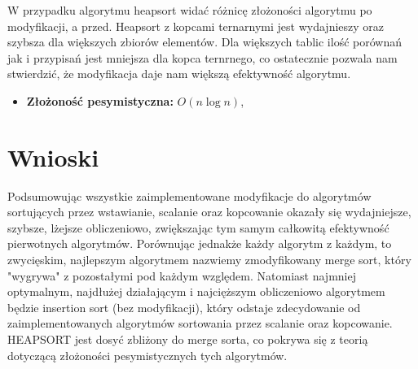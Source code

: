 \documentclass{article}
\begin{document}
\newpage

	
\large{W przypadku algorytmu heapsort widać różnicę złożoności algorytmu po modyfikacji, a przed. Heapsort z kopcami ternarnymi jest wydajnieszy oraz szybsza dla większych zbiorów elementów. Dla większych tablic ilość porównań jak i przypisań jest mniejsza dla kopca ternrnego, co ostatecznie pozwala nam stwierdzić, że modyfikacja daje nam większą efektywność algorytmu.} 

\begin{itemize}
	\item \textbf{Złożoność pesymistyczna:} $O(n \log n)$,
\end{itemize}


	\section{Wnioski}
\large{Podsumowując wszystkie zaimplementowane modyfikacje do algorytmów sortujących przez wstawianie, scalanie oraz kopcowanie okazały się wydajniejsze, szybsze, lżejsze obliczeniowo, zwiększając tym samym całkowitą efektywność pierwotnych algorytmów. Porównując jednakże każdy algorytm z każdym, to zwycięskim, najlepszym algorytmem nazwiemy zmodyfikowany merge sort, który "wygrywa" z pozostałymi pod każdym względem. Natomiast najmniej optymalnym, najdłużej działającym i najcięższym obliczeniowo algorytmem będzie insertion sort (bez modyfikacji), który odstaje zdecydowanie od zaimplementowanych algorytmów sortowania przez scalanie oraz kopcowanie. HEAPSORT  jest dosyć zbliżony do merge sorta, co pokrywa się z teorią dotyczącą złożoności pesymistycznych tych algorytmów.}
\end{document}
